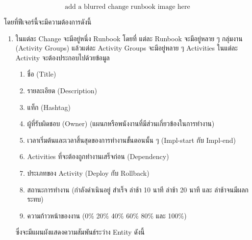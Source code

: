 \[\text{add a blurred change runbook image here}\]

โดยที่ฟีเจอร์นี้จะมีความต้องการดังนี้
\begin{enumerate}
    \item ในแต่ละ Change จะมีอยู่หนึ่ง Runbook โดยที่ แต่ละ Runbook จะมีอยู่หลาย ๆ กลุ่มงาน (Activity Groups) แล้วแต่ละ Activity Groups จะมีอยู่หลาย ๆ Activities ในแต่ละ Activity จะต้องประกอบไปด้วยข้อมูล 
    \begin{enumerate}
        \item ชื่อ (Title)
        \item รายละเอียด (Description) 
        \item แท็ก (Hashtag)
        \item ผู้ที่รับผิดชอบ (Owner) (แผนกหรือพนังงานที่มีส่วนเกี่ยวข้องในการทำงาน)
        \item เวลาเริ่มต้นและเวลาสิ้นสุดของการทำงานขั้นตอนนั้น ๆ (Impl-start กับ Impl-end)
        \item Activities ที่จะต้องถูกทำงานเสร็จก่อน (Dependency)
        \item ประเภทของ Activity (Deploy กับ Rollback)
        \item สถานะการทำงาน (กำลังดำเนินอยู่ สำเร็จ ล่าช้า 10 นาที ล่าช้า 20 นาที และ ล่าช้าจนมีผลกระทบ)
        \item ความก้าวหน้าของงาน (0\% 20\% 40\% 60\% 80\% และ 100\%)
    \end{enumerate}
    ซึ่งจะมีแผนผังแสดงความสัมพันธ์ระว่าง Entity ดังนี้
    \begin{figure}
        \begin{center}
\end{center}
\end{figure}
\end{enumerate}
